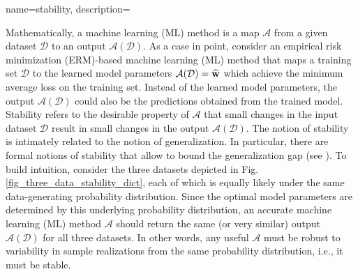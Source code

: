 {
{name={stability},
	description={
	Mathematically, a machine learning (ML) method is a map $\mathcal{A}$ from a given dataset $\mathcal{D}$ 
	to an output $\mathcal{A}(\mathcal{D})$. As a case in point, consider an empirical risk minimization (ERM)-based 
	machine learning (ML) method that maps a training set $\mathcal{D}$ to the learned model parameters 
	$\mathcal{A}(\mathcal{D}) = \widehat{{\bf w}}$ which achieve the minimum average loss 
	on the training set. Instead of the learned model parameters, the 
	output $\mathcal{A}(\mathcal{D})$ could also be the predictions obtained from 
	the trained model. Stability refers to the desirable property 
	of $\mathcal{A}$ that small changes in the input dataset $\mathcal{D}$ result in small 
	changes in the output $\mathcal{A}(\mathcal{D})$. The notion of stability is intimately related 
	to the notion of generalization. In particular, there are formal notions of stability  
	that allow to bound the generalization gap (see \cite[Ch.~13]{ShalevMLBook}).
		To build intuition, consider the three datasets depicted in Fig. \ref{fig_three_data_stability_dict}, each 
		of which is equally likely under the same data-generating probability distribution. Since the 
		optimal model parameters are determined by this underlying probability distribution, an accurate 
		machine learning (ML) method $\mathcal{A}$ should return the same (or very similar) output $\mathcal{A}(\mathcal{D})$ 
		for all three datasets. In other words, any useful $\mathcal{A}$ must be robust to 
		variability in sample realizations from the same probability distribution, i.e., it must be stable. 
		\begin{figure}[H]
			\centering
\end{figure}}}}
